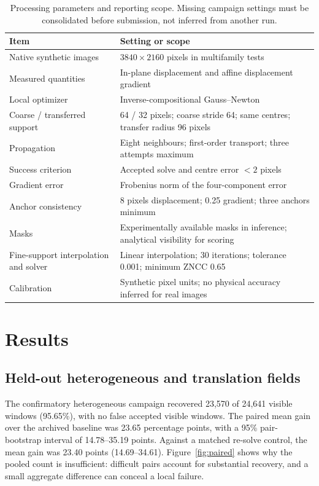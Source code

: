 \documentclass[11pt,a4paper]{article}
\begin{document}
\begin{table}[tb]\centering\caption{Processing parameters and reporting scope. Missing campaign settings must be consolidated before submission, not inferred from another run.}\small
\begin{tabular}{p{.35\linewidth}p{.57\linewidth}}\toprule Item & Setting or scope\\\midrule
Native synthetic images & $3840\times2160$ pixels in multifamily tests\\
Measured quantities & In-plane displacement and affine displacement gradient\\
Local optimizer & Inverse-compositional Gauss--Newton\\
Coarse / transferred support & 64 / 32 pixels; coarse stride 64; same centres; transfer radius 96 pixels\\
Propagation & Eight neighbours; first-order transport; three attempts maximum\\
Success criterion & Accepted solve and centre error $<2$ pixels\\
Gradient error & Frobenius norm of the four-component error\\
Anchor consistency & 8 pixels displacement; 0.25 gradient; three anchors minimum\\
Masks & Experimentally available masks in inference; analytical visibility for scoring\\
Fine-support interpolation and solver & Linear interpolation; 30 iterations; tolerance 0.001; minimum ZNCC 0.65\\
Calibration & Synthetic pixel units; no physical accuracy inferred for real images\\\bottomrule
\end{tabular}\end{table}

\section{Results}
\subsection{Held-out heterogeneous and translation fields}
The confirmatory heterogeneous campaign recovered 23,570 of 24,641 visible windows (95.65\%), with no false accepted visible windows. The paired mean gain over the archived baseline was 23.65 percentage points, with a 95\% pair-bootstrap interval of 14.78--35.19 points. Against a matched re-solve control, the mean gain was 23.40 points (14.69--34.61). Figure~\ref{fig:paired} shows why the pooled count is insufficient: difficult pairs account for substantial recovery, and a small aggregate difference can conceal a local failure.
\end{document}
